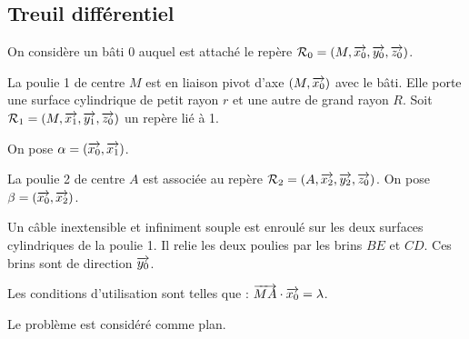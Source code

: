 \documentclass[10pt]{article}
\begin{document}
\subsection*{Treuil différentiel}
\begin{minipage}[c]{.65\linewidth}
On considère un bâti 0 auquel est attaché le repère $\mathcal{R}_0 = \left(M,\overrightarrow{x_0},\overrightarrow{y_0},\overrightarrow{z_0}\right)$.

La poulie 1 de centre $M$ est en liaison pivot d'axe $\left(M,\overrightarrow{x_0}\right)$  avec le bâti. Elle porte une surface cylindrique de petit rayon $r$ et une autre de grand rayon $R$. Soit $\mathcal{R}_1 = \left(M,\overrightarrow{x_1},\overrightarrow{y_1},\overrightarrow{z_0}\right)$ un repère lié à 1.

On pose $\alpha=\left(\overrightarrow{x_0},\overrightarrow{x_1}\right)$.

La poulie 2 de centre $A$ est associée au repère $\mathcal{R}_2 = \left(A,\overrightarrow{x_2},\overrightarrow{y_2},\overrightarrow{z_0}\right)$. On pose $\beta=\left(\overrightarrow{x_0},\overrightarrow{x_2}\right)$.

Un câble inextensible et infiniment souple est enroulé sur les deux surfaces cylindriques de la poulie 1. Il relie les deux poulies par les brins $BE$ et $CD$. Ces brins sont de direction $\overrightarrow{y_0}$.

Les conditions d'utilisation sont telles que : $\overrightarrow{MA}\cdot \overrightarrow{x_0} = \lambda$.

Le problème est considéré comme plan.
\end{minipage}\hfill
\end{document}
